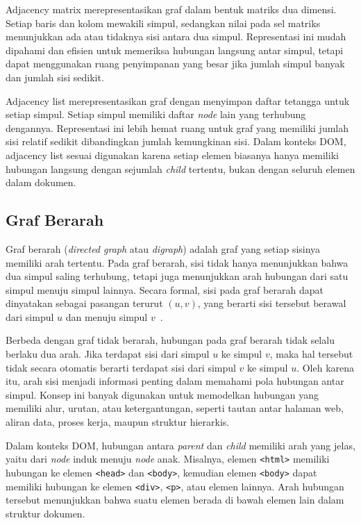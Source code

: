 Adjacency matrix merepresentasikan graf dalam bentuk matriks dua dimensi. Setiap baris dan kolom mewakili simpul, sedangkan nilai pada sel matriks menunjukkan ada atau tidaknya sisi antara dua simpul. Representasi ini mudah dipahami dan efisien untuk memeriksa hubungan langsung antar simpul, tetapi dapat menggunakan ruang penyimpanan yang besar jika jumlah simpul banyak dan jumlah sisi sedikit.

Adjacency list merepresentasikan graf dengan menyimpan daftar tetangga untuk setiap simpul. Setiap simpul memiliki daftar \textit{node} lain yang terhubung dengannya. Representasi ini lebih hemat ruang untuk graf yang memiliki jumlah sisi relatif sedikit dibandingkan jumlah kemungkinan sisi. Dalam konteks DOM, adjacency list sesuai digunakan karena setiap elemen biasanya hanya memiliki hubungan langsung dengan sejumlah \textit{child} tertentu, bukan dengan seluruh elemen dalam dokumen.

\subsection{Graf Berarah}
Graf berarah ({\it directed graph} atau {\it digraph}) adalah graf yang setiap sisinya memiliki arah tertentu. Pada graf berarah, sisi tidak hanya menunjukkan bahwa dua simpul saling terhubung, tetapi juga menunjukkan arah hubungan dari satu simpul menuju simpul lainnya. Secara formal, sisi pada graf berarah dapat dinyatakan sebagai pasangan terurut $(u,v)$, yang berarti sisi tersebut berawal dari simpul $u$ dan menuju simpul $v$~\cite{cormen:22:introalgo}.

Berbeda dengan graf tidak berarah, hubungan pada graf berarah tidak selalu berlaku dua arah. Jika terdapat sisi dari simpul $u$ ke simpul $v$, maka hal tersebut tidak secara otomatis berarti terdapat sisi dari simpul $v$ ke simpul $u$. Oleh karena itu, arah sisi menjadi informasi penting dalam memahami pola hubungan antar simpul. Konsep ini banyak digunakan untuk memodelkan hubungan yang memiliki alur, urutan, atau ketergantungan, seperti tautan antar halaman web, aliran data, proses kerja, maupun struktur hierarkis.

Dalam konteks DOM, hubungan antara \textit{parent} dan \textit{child} memiliki arah yang jelas, yaitu dari \textit{node} induk menuju \textit{node} anak. Misalnya, elemen \texttt{<html>} memiliki hubungan ke elemen \texttt{<head>} dan \texttt{<body>}, kemudian elemen \texttt{<body>} dapat memiliki hubungan ke elemen \texttt{<div>}, \texttt{<p>}, atau elemen lainnya. Arah hubungan tersebut menunjukkan bahwa suatu elemen berada di bawah elemen lain dalam struktur dokumen.

